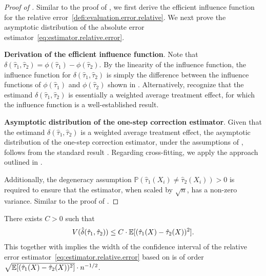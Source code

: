 \begin{proof}[Proof of ]
    Similar to the proof of ,  we first derive the efficient influence function for the relative error~\eqref{defi:evaluation.error.relative}. 
    We next prove the asymptotic distribution of the absolute error estimator~\eqref{eq:estimator.relative.error}.

    \noindent \textbf{Derivation of the efficient influence function}.
    Note that $\delta(\hat{\tau}_1, \hat{\tau}_2) = \phi(\hat{\tau}_1) - \phi(\hat{\tau}_2)$. By the linearity of the influence function, the influence function for $\delta(\hat{\tau}_1, \hat{\tau}_2)$ is simply the difference between the influence functions of $\phi(\hat{\tau}_1)$ and $\phi(\hat{\tau}_2)$ shown in . 
    Alternatively, recognize that the estimand $\delta(\hat{\tau}_1, \hat{\tau}_2)$ is essentially a weighted average treatment effect, for which the influence function is a well-established result.

    \noindent \textbf{Asymptotic distribution of the one-step correction estimator}.
    Given that the estimand $\delta(\hat{\tau}_1, \hat{\tau}_2)$ is a weighted average treatment effect, the asymptotic distribution of the one-step correction estimator, under the assumptions of , follows from the standard result \parencite{kennedy2022semiparametric}. 
    Regarding cross-fitting, we apply the approach outlined in \cite{chernozhukov2018double}. 
    
    Additionally, the degeneracy assumption $\mathbb{P}(\hat{\tau}_1(X_i) \neq \hat{\tau}_2(X_i)) > 0$ is required to ensure that the estimator, when scaled by $\sqrt{n}$, has a non-zero variance. Similar to the proof of .
\end{proof}


\begin{proposition}\label{prop:relative.error.CI.width}
    There exists $C > 0$ such that
    \begin{align*}
        V(\hat{\delta}(\hat{\tau}_1, \hat{\tau}_2)) \le C \cdot \mathbb{E}[(\hat{\tau}_1(X) - \hat{\tau}_2(X))^2].
    \end{align*}
    This together with  implies the width of the confidence interval of the relative error estimator~\eqref{eq:estimator.relative.error} based on  is of order $\sqrt{\mathbb{E}[(\hat{\tau}_1(X) - \hat{\tau}_2(X))^2]} \cdot {n}^{-1/2}$.
\end{proposition}


